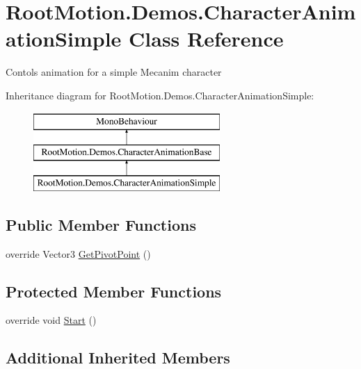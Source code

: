 \hypertarget{class_root_motion_1_1_demos_1_1_character_animation_simple}{}\section{Root\+Motion.\+Demos.\+Character\+Animation\+Simple Class Reference}
\label{class_root_motion_1_1_demos_1_1_character_animation_simple}


Contols animation for a simple Mecanim character  


Inheritance diagram for Root\+Motion.\+Demos.\+Character\+Animation\+Simple\+:\begin{figure}[H]
\begin{center}
\leavevmode
\includegraphics[height=3.000000cm]{class_root_motion_1_1_demos_1_1_character_animation_simple}
\end{center}
\end{figure}
\subsection*{Public Member Functions}
\begin{DoxyCompactItemize}
\item 
override Vector3 \mbox{\hyperlink{class_root_motion_1_1_demos_1_1_character_animation_simple_a29a14a93fd7a5a21c5828536b2d4e721}{Get\+Pivot\+Point}} ()
\end{DoxyCompactItemize}
\subsection*{Protected Member Functions}
\begin{DoxyCompactItemize}
\item 
override void \mbox{\hyperlink{class_root_motion_1_1_demos_1_1_character_animation_simple_a0c5809611cc12b2339420de15dc3bcc2}{Start}} ()
\end{DoxyCompactItemize}
\subsection*{Additional Inherited Members}


